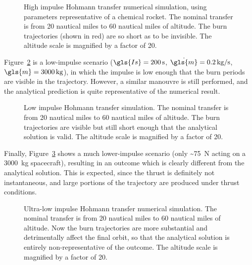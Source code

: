 \documentclass[12pt,openany]{book}
\begin{document}
\begin{figure}[htbp]
  \centering
  \resizebox{0.5\textwidth}{!}{}
  \caption{High impulse Hohmann transfer numerical simulation, using parameters representative of a chemical rocket. The nominal transfer is from 20 nautical miles to 60 nautical miles of altitude. The burn trajectories (shown in red) are so short as to be invisible. The altitude scale is magnified by a factor of 20.}
  \label{fig:hohmann-high-impulse}
\end{figure}

Figure~\ref{fig:hohmann-low-impulse} is a low-impulse scenario (\(\gls{Is}=\SI{200}{s}\), \(\dot{\gls{m}}=\SI{0.2}{kg\per\s}\), \(\gls{m}=\SI{3000}{kg}\)), in which the impulse is low enough that the burn periods are visible in the trajectory. However, a similar manouvre is still performed, and the analytical prediction is quite representative of the numerical result.

\begin{figure}[htbp]
  \centering
  \resizebox{0.5\textwidth}{!}{}
  \caption{Low impulse Hohmann transfer simulation. The nominal transfer is from 20 nautical miles to 60 nautical miles of altitude. The burn trajectories are visible but still short enough that the analytical solution is valid. The altitude scale is magnified by a factor of 20.}
  \label{fig:hohmann-low-impulse}
\end{figure}

Finally, Figure~\ref{fig:hohmann-ultra-low-impulse} shows a much lower-impulse scenario (only \SI{~75}{N} acting on a \SI{3000}{kg} spacecraft), resulting in an outcome which is clearly different from the analytical solution. This is expected, since the thrust is definitely not instantaneous, and large portions of the trajectory are produced under thrust conditions.

\begin{figure}[htbp]
  \centering
  \resizebox{0.5\textwidth}{!}{}
  \caption{Ultra-low impulse Hohmann transfer numerical simulation. The nominal transfer is from 20 nautical miles to 60 nautical miles of altitude. Now the burn trajectories are more substantial and detrimentally affect the final orbit, so that the analytical solution is entirely non-representative of the outcome. The altitude scale is magnified by a factor of 20.}
  \label{fig:hohmann-ultra-low-impulse}
\end{figure}
\end{document}
